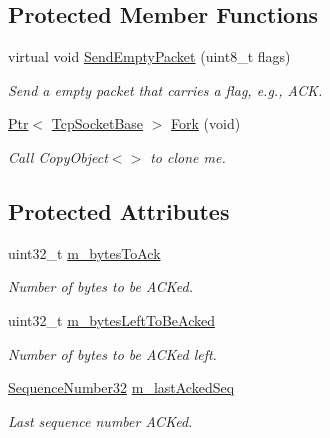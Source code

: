 \subsection*{Protected Member Functions}
\begin{DoxyCompactItemize}
\item 
virtual void \hyperlink{classns3_1_1TcpSocketSmallAcks_aa1b40c84003225f76661534dfa82634b}{Send\+Empty\+Packet} (uint8\+\_\+t flags)
\begin{DoxyCompactList}\small\item\em Send a empty packet that carries a flag, e.\+g., A\+CK. \end{DoxyCompactList}\item 
\hyperlink{classns3_1_1Ptr}{Ptr}$<$ \hyperlink{classns3_1_1TcpSocketBase}{Tcp\+Socket\+Base} $>$ \hyperlink{classns3_1_1TcpSocketSmallAcks_a945f1256f9e850886f13746d8c703f36}{Fork} (void)
\begin{DoxyCompactList}\small\item\em Call Copy\+Object$<$$>$ to clone me. \end{DoxyCompactList}\end{DoxyCompactItemize}
\subsection*{Protected Attributes}
\begin{DoxyCompactItemize}
\item 
uint32\+\_\+t \hyperlink{classns3_1_1TcpSocketSmallAcks_a936e4af4cfc9c1f108511c65cfe675be}{m\+\_\+bytes\+To\+Ack}
\begin{DoxyCompactList}\small\item\em Number of bytes to be A\+C\+Ked. \end{DoxyCompactList}\item 
uint32\+\_\+t \hyperlink{classns3_1_1TcpSocketSmallAcks_ad2e2f67059d57638e853931260d60a77}{m\+\_\+bytes\+Left\+To\+Be\+Acked}
\begin{DoxyCompactList}\small\item\em Number of bytes to be A\+C\+Ked left. \end{DoxyCompactList}\item 
\hyperlink{group__network_gacb2070e4e98d2d5135c9bede58f07a03}{Sequence\+Number32} \hyperlink{classns3_1_1TcpSocketSmallAcks_a7e45496712cf340a50b856f580a88561}{m\+\_\+last\+Acked\+Seq}
\begin{DoxyCompactList}\small\item\em Last sequence number A\+C\+Ked. \end{DoxyCompactList}\end{DoxyCompactItemize}
